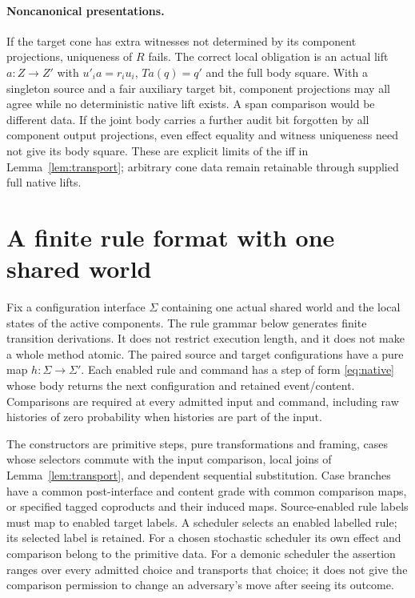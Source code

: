 \documentclass[11pt]{article}
\begin{document}
\paragraph{Noncanonical presentations.} If the target cone has extra witnesses not determined by its component projections, uniqueness of $R$ fails. The correct local obligation is an actual lift $a:Z\to Z'$ with $u'_ia=r_iu_i$, $Ta(q)=q'$ and the full body square. With a singleton source and a fair auxiliary target bit, component projections may all agree while no deterministic native lift exists. A span comparison would be different data. If the joint body carries a further audit bit forgotten by all component output projections, even effect equality and witness uniqueness need not give its body square. These are explicit limits of the iff in Lemma~\ref{lem:transport}; arbitrary cone data remain retainable through supplied full native lifts.

\section{A finite rule format with one shared world}

Fix a configuration interface $\Sigma$ containing one actual shared world and the local states of the active components. The rule grammar below generates finite transition derivations. It does not restrict execution length, and it does not make a whole method atomic. The paired source and target configurations have a pure map $h:\Sigma\to\Sigma'$. Each enabled rule and command has a step of form \eqref{eq:native} whose body returns the next configuration and retained event/content. Comparisons are required at every admitted input and command, including raw histories of zero probability when histories are part of the input.

The constructors are primitive steps, pure transformations and framing, cases whose selectors commute with the input comparison, local joins of Lemma~\ref{lem:transport}, and dependent sequential substitution. Case branches have a common post-interface and content grade with common comparison maps, or specified tagged coproducts and their induced maps. Source-enabled rule labels must map to enabled target labels. A scheduler selects an enabled labelled rule; its selected label is retained. For a chosen stochastic scheduler its own effect and comparison belong to the primitive data. For a demonic scheduler the assertion ranges over every admitted choice and transports that choice; it does not give the comparison permission to change an adversary's move after seeing its outcome.
\end{document}
